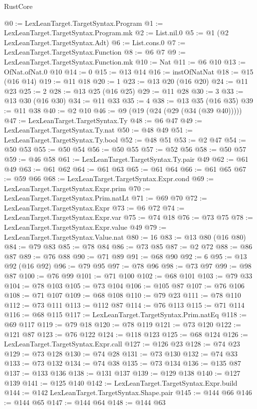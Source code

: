 \begin{lexlean}{RustCore}
\begin{coremodule}
@0 := LexLeanTarget.TargetSyntax.Program
@1 := LexLeanTarget.TargetSyntax.Program.mk
@2 := List.nil.{0}
@5 := @1 (@2 LexLeanTarget.TargetSyntax.Adt)
@6 := List.cons.{0}
@7 := LexLeanTarget.TargetSyntax.Function
@8 := @6 @7
@9 := LexLeanTarget.TargetSyntax.Function.mk
@10 := Nat
@11 := @6 @10
@13 := OfNat.ofNat.{0} @10
@14 := 0
@15 := @13 @14
@16 := instOfNatNat
@18 := @15 (@16 @14)
@19 := @11 @18
@20 := 1
@23 := @13 @20 (@16 @20)
@24 := @11 @23
@25 := 2
@28 := @13 @25 (@16 @25)
@29 := @11 @28
@30 := 3
@33 := @13 @30 (@16 @30)
@34 := @11 @33
@35 := 4
@38 := @13 @35 (@16 @35)
@39 := @11 @38
@40 := @2 @10
@46 := @9 (@19 (@24 (@29 (@34 (@39 @40)))))
@47 := LexLeanTarget.TargetSyntax.Ty
@48 := @6 @47
@49 := LexLeanTarget.TargetSyntax.Ty.nat
@50 := @48 @49
@51 := LexLeanTarget.TargetSyntax.Ty.bool
@52 := @48 @51
@53 := @2 @47
@54 := @50 @53
@55 := @50 @54
@56 := @50 @55
@57 := @52 @56
@58 := @50 @57
@59 := @46 @58
@61 := LexLeanTarget.TargetSyntax.Ty.pair @49
@62 := @61 @49
@63 := @61 @62
@64 := @61 @63
@65 := @61 @64
@66 := @61 @65
@67 := @59 @66
@68 := LexLeanTarget.TargetSyntax.Expr.cond
@69 := LexLeanTarget.TargetSyntax.Expr.prim
@70 := LexLeanTarget.TargetSyntax.Prim.natLt
@71 := @69 @70
@72 := LexLeanTarget.TargetSyntax.Expr
@73 := @6 @72
@74 := LexLeanTarget.TargetSyntax.Expr.var
@75 := @74 @18
@76 := @73 @75
@78 := LexLeanTarget.TargetSyntax.Expr.value @49
@79 := LexLeanTarget.TargetSyntax.Value.nat
@80 := 16
@83 := @13 @80 (@16 @80)
@84 := @79 @83
@85 := @78 @84
@86 := @73 @85
@87 := @2 @72
@88 := @86 @87
@89 := @76 @88
@90 := @71 @89
@91 := @68 @90
@92 := 6
@95 := @13 @92 (@16 @92)
@96 := @79 @95
@97 := @78 @96
@98 := @73 @97
@99 := @98 @87
@100 := @76 @99
@101 := @71 @100
@102 := @68 @101
@103 := @79 @33
@104 := @78 @103
@105 := @73 @104
@106 := @105 @87
@107 := @76 @106
@108 := @71 @107
@109 := @68 @108
@110 := @79 @23
@111 := @78 @110
@112 := @73 @111
@113 := @112 @87
@114 := @76 @113
@115 := @71 @114
@116 := @68 @115
@117 := LexLeanTarget.TargetSyntax.Prim.natEq
@118 := @69 @117
@119 := @79 @18
@120 := @78 @119
@121 := @73 @120
@122 := @121 @87
@123 := @76 @122
@124 := @118 @123
@125 := @68 @124
@126 := LexLeanTarget.TargetSyntax.Expr.call
@127 := @126 @23
@128 := @74 @23
@129 := @73 @128
@130 := @74 @28
@131 := @73 @130
@132 := @74 @33
@133 := @73 @132
@134 := @74 @38
@135 := @73 @134
@136 := @135 @87
@137 := @133 @136
@138 := @131 @137
@139 := @129 @138
@140 := @127 @139
@141 := @125 @140
@142 := LexLeanTarget.TargetSyntax.Expr.build
@144 := @142 LexLeanTarget.TargetSyntax.Shape.pair
@145 := @144 @66
@146 := @144 @65
@147 := @144 @64
@148 := @144 @63

\end{coremodule}
\end{lexlean}
